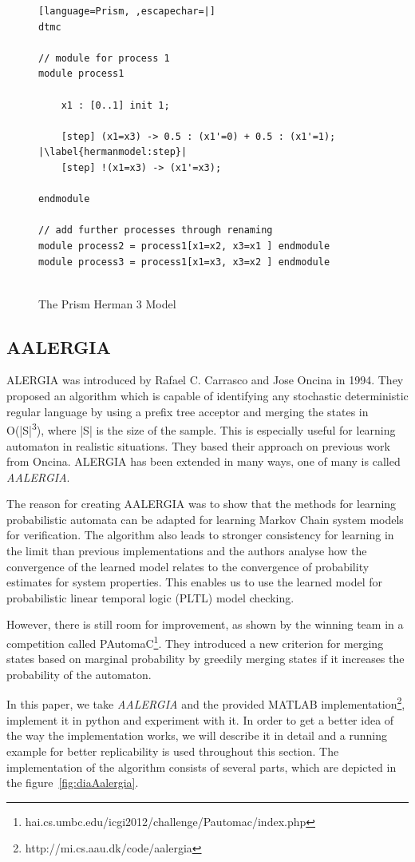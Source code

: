 \documentclass[
a4paper,
12pt
]{scrartcl}
\begin{document}
\begin{figure}[ht!]
\begin{lstlisting}[language=Prism, ,escapechar=|]
dtmc

// module for process 1
module process1

	x1 : [0..1] init 1;
	
	[step] (x1=x3) -> 0.5 : (x1'=0) + 0.5 : (x1'=1); |\label{hermanmodel:step}|
	[step] !(x1=x3) -> (x1'=x3);
	
endmodule

// add further processes through renaming
module process2 = process1[x1=x2, x3=x1 ] endmodule
module process3 = process1[x1=x3, x3=x2 ] endmodule


\end{lstlisting}
\caption{The Prism Herman 3 Model}
\label{fig:hermanmodel}
\end{figure}

\subsection{AALERGIA}
ALERGIA\cite{Carrasco.1994} was introduced by Rafael C. Carrasco and Jose Oncina in 1994. They proposed an algorithm which is capable of identifying any stochastic deterministic regular language by using a prefix tree acceptor and merging the states in O(|S|\textsuperscript{3}), where |S| is the size of the sample. This is especially useful for learning automaton in realistic situations. They based their approach on previous work from Oncina\cite{Oncina92}. ALERGIA has been extended in many ways, one of many is called \emph{AALERGIA}\cite{Mao.}.
\par The reason for creating AALERGIA was to show that the methods for learning probabilistic automata can be adapted for learning Markov Chain system models for verification. The algorithm also leads to stronger consistency for learning in the limit than previous implementations and the authors analyse how the convergence of the learned model relates to the convergence of probability estimates for system properties. This enables us to use the learned model for probabilistic linear temporal logic (PLTL) model checking.
\par However, there is still room for improvement, as shown by the winning team\cite{Shibata_the11th} in a competition called PAutomaC\footnote{hai.cs.umbc.edu/icgi2012/challenge/Pautomac/index.php}. They introduced a new criterion for merging states based on marginal probability by greedily merging states if it increases the probability of the automaton.
\par In this paper, we take \emph{AALERGIA} and the provided MATLAB implementation\footnote{http://mi.cs.aau.dk/code/aalergia}, implement it in python and experiment with it. In order to get a better idea of the way the implementation works, we will describe it in detail and a running example for better replicability is used throughout this section. The implementation of the algorithm consists of several parts, which are depicted in the figure~\ref{fig:diaAalergia}.
\end{document}
